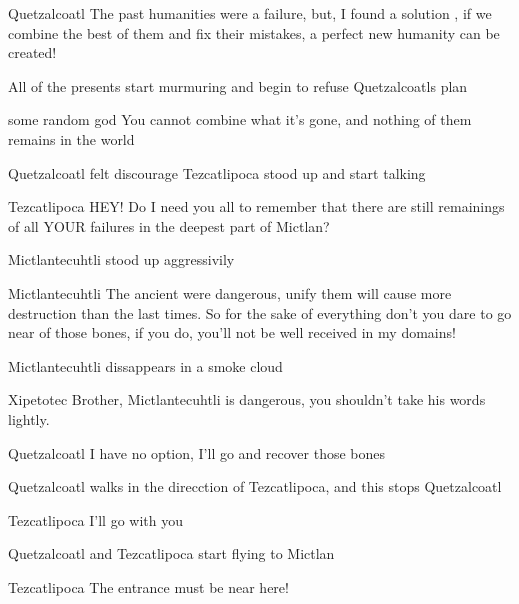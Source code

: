 \documentclass{screenplay}[2012/06/30]
\begin{document}
\begin{dialogue}[continuing]{Quetzalcoatl}
The past humanities were a failure, but, I found a solution , if we combine the best of them and fix their mistakes, a perfect new humanity can be created! 
\end{dialogue}

All of the presents start murmuring and begin to refuse Quetzalcoatls plan

\begin{dialogue}{some random god}
You cannot combine what it's gone, and nothing of them remains in the world
\end{dialogue}

Quetzalcoatl felt discourage
Tezcatlipoca stood up and start talking

\begin{dialogue}{Tezcatlipoca}
HEY! Do I need you all to remember that there are still remainings of all YOUR failures in the deepest part of Mictlan? 
\end{dialogue}

Mictlantecuhtli stood up aggressivily
\begin{dialogue}[angry]{Mictlantecuhtli}
The ancient were dangerous, unify them will cause more destruction than the last times. So for the sake of everything don't you dare to go near of those bones, if you do, you'll not be well received in my domains!
\end{dialogue}

Mictlantecuhtli dissappears in a smoke cloud


\begin{dialogue}{Xipetotec}
Brother, Mictlantecuhtli is dangerous, you shouldn't take his words lightly.
\end{dialogue}


\begin{dialogue}{Quetzalcoatl}
I have no option, I'll go and recover those bones
\end{dialogue}

Quetzalcoatl walks in the direcction of Tezcatlipoca, and this stops Quetzalcoatl
\begin{dialogue}[confident]{Tezcatlipoca}
I'll go with you
\end{dialogue}


Quetzalcoatl and Tezcatlipoca start flying to Mictlan


\begin{dialogue}{Tezcatlipoca}
 The entrance must be near here!
\end{dialogue}
\end{document}
